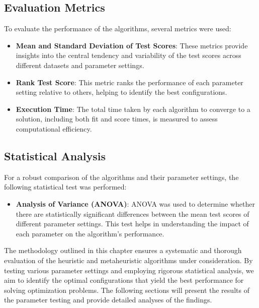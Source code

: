 \documentclass{article}
\begin{document}
    \subsection{Evaluation Metrics}

    To evaluate the performance of the algorithms, several metrics were used:

    \begin{itemize}
        \item \textbf{Mean and Standard Deviation of Test Scores}: These metrics provide insights into the central tendency and variability of the test scores across different datasets and parameter settings.
        \item \textbf{Rank Test Score}: This metric ranks the performance of each parameter setting relative to others, helping to identify the best configurations.
        \item \textbf{Execution Time}: The total time taken by each algorithm to converge to a solution, including both fit and score times, is measured to assess computational efficiency.
    \end{itemize}

    \subsection{Statistical Analysis}

    For a robust comparison of the algorithms and their parameter settings, the following statistical test was performed:

    \begin{itemize}
        \item \textbf{Analysis of Variance (ANOVA)}: ANOVA was used to determine whether there are statistically significant differences between the mean test scores of different parameter settings. This test helps in understanding the impact of each parameter on the algorithm's performance.
    \end{itemize}


    The methodology outlined in this chapter ensures a systematic and thorough evaluation of the heuristic and metaheuristic algorithms under consideration. By testing various parameter settings and employing rigorous statistical analysis, we aim to identify the optimal configurations that yield the best performance for solving optimization problems. The following sections will present the results of the parameter testing and provide detailed analyses of the findings.
\end{document}
